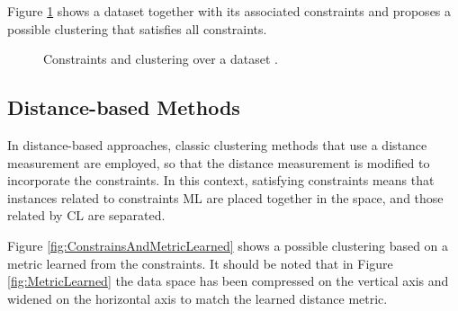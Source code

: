 Figure \ref{fig:ConstClustOverDataset} shows a dataset together with its associated constraints and proposes a possible clustering that satisfies all constraints.

\begin{figure}[bth]
	\myfloatalign
	\hspace{1cm}
	
	\caption[Constraints and clustering over a dataset]{Constraints and clustering over a dataset \cite{davidson2007survey}.} \label{fig:ConstClustOverDataset}
\end{figure}

\subsection{Distance-based Methods}

In distance-based approaches, classic clustering methods that use a distance measurement are employed, so that the distance measurement is modified to incorporate the constraints. In this context, satisfying constraints means that instances related to constraints \acs{ML} are placed together in the space, and those related by \acs{CL} are separated.

Figure \ref{fig:ConstrainsAndMetricLearned} shows a possible clustering based on a metric learned from the constraints. It should be noted that in Figure \ref{fig:MetricLearned} the data space has been compressed on the vertical axis and widened on the horizontal axis to match the learned distance metric.

